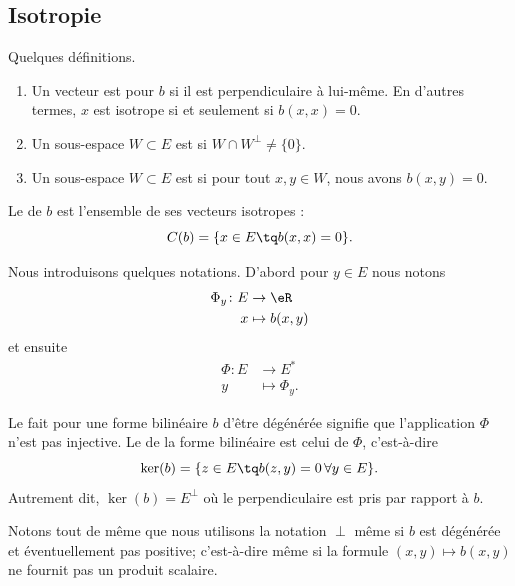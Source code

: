 \subsection{Isotropie}

\begin{definition}   \label{DefVKMnUEM}
	Quelques définitions.
	\begin{enumerate}
		\item
		      Un vecteur est  pour \( b\) si il est perpendiculaire à lui-même. En d'autres termes, \( x\) est isotrope si et seulement si \( b(x,x)=0\).
		\item
		      Un sous-espace \( W\subset E\) est  si \( W\cap W^{\perp}\neq \{ 0 \}\).
		\item

		      Un sous-espace \( W\subset E\) est  si pour tout \( x,y\in W\), nous avons \( b(x,y)=0\).
	\end{enumerate}

	Le  de \( b\) est l'ensemble de ses vecteurs isotropes :
	\begin{equation}
		C(b)=\{ x\in E\tq b(x,x)=0 \}.
	\end{equation}
\end{definition}
Nous introduisons quelques notations. D'abord pour \( y\in E\) nous notons
\begin{equation}
	\begin{aligned}
		\Phi_y\colon E & \to \eR        \\
		x              & \mapsto b(x,y)
	\end{aligned}
\end{equation}
et ensuite
\begin{equation}
	\begin{aligned}
		\Phi\colon E & \to E^*         \\
		y            & \mapsto \Phi_y.
	\end{aligned}
\end{equation}

\begin{definition}		\label{DEFooHKQVooPuWZiP}
	Le fait pour une forme bilinéaire \( b\) d'être dégénérée signifie que l'application \( \Phi\) n'est pas injective. Le  de la forme bilinéaire est celui de \( \Phi\), c'est-à-dire
	\begin{equation}
		\ker(b)=\{ z\in E\tq b(z,y)=0\,\forall y\in E \}.
	\end{equation}
	Autrement dit, \( \ker(b)=E^{\perp}\) où le perpendiculaire est pris par rapport à \( b\).
\end{definition}
Notons tout de même que nous utilisons la notation \( \perp\) même si \( b\) est dégénérée et éventuellement pas positive; c'est-à-dire même si la formule \( (x,y)\mapsto b(x,y)\) ne fournit pas un produit scalaire.


